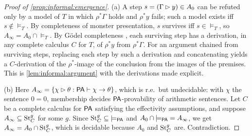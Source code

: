 \begin{proof}[Proof of \cref{prop:informal:emergence}]
(a) A step $s=(\Gamma\rhd y)\in A_0$ can be refuted only by a model of $T$ in which $\rho^*\Gamma$ holds and $\rho^*y$ fails; such a model exists iff $s\notin{\models_T}$. By completeness of monster presentation, $s$ survives iff $s\in{\models_T}$, so $A_\infty=A_0\cap{\models_T}$. By Gödel completeness \citep{godel1930vollstandigkeit}, each surviving step has a derivation, in any complete calculus $C$ for $T$, of $\rho^*y$ from $\rho^*\Gamma$. For an argument chained from surviving steps, replacing each step by such a derivation and concatenating yields a $C$-derivation of the $\rho^*$-image of the conclusion from the images of the premises. This is \cref{lem:informal:argument} with the derivations made explicit.

(b) Here $A_\infty=\{\chi\rhd\theta:\mathsf{PA}\vdash\chi\to\theta\}$, which is r.e.\ but undecidable: with $\chi$ the sentence $0=0$, membership decides $\mathsf{PA}$-provability of arithmetic sentences. Let $C$ be a complete calculus for $\mathsf{PA}$ satisfying the effectivity assumptions, and suppose $A_\infty\subseteq\mathrm{St}^{g}_{C}$ for some $g$. Since $\mathrm{St}^{g}_{C}\subseteq{\models_{\mathsf{PA}}}$ and $A_0\cap{\models_{\mathsf{PA}}}=A_\infty$, we get $A_\infty=A_0\cap\mathrm{St}^{g}_{C}$, which is decidable because $A_0$ and $\mathrm{St}^{g}_{C}$ are. Contradiction.


\end{proof}
